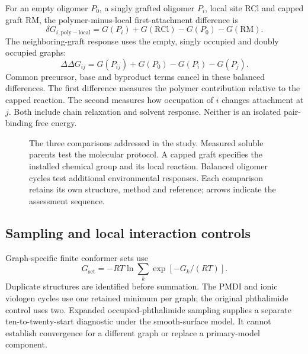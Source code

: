 \documentclass[11pt]{article}
\begin{document}
For an empty oligomer $P_0$, a singly grafted oligomer $P_i$, local site RCl and capped graft RM, the polymer-minus-local first-attachment difference is
\begin{equation}
\delta G_{i,\mathrm{poly-local}}=G(P_i)+G(\mathrm{RCl})-G(P_0)-G(\mathrm{RM}).
\label{eq:polylocal}
\end{equation}
The neighboring-graft response uses the empty, singly occupied and doubly occupied graphs:
\begin{equation}
\Delta\Delta G_{ij}=G(P_{ij})+G(P_0)-G(P_i)-G(P_j).
\label{eq:nonadditivity}
\end{equation}
Common precursor, base and byproduct terms cancel in these balanced differences. The first difference measures the polymer contribution relative to the capped reaction. The second measures how occupation of $i$ changes attachment at $j$. Both include chain relaxation and solvent response. Neither is an isolated pair-binding free energy.

\begin{figure}[htbp]\centering
{}
\caption{The three comparisons addressed in the study. Measured soluble parents test the molecular protocol. A capped graft specifies the installed chemical group and its local reaction. Balanced oligomer cycles test additional environmental responses. Each comparison retains its own structure, method and reference; arrows indicate the assessment sequence.}
\label{fig:workflow}\end{figure}

\subsection{Sampling and local interaction controls}
Graph-specific finite conformer sets use
\begin{equation}
G_{\mathrm{set}}=-RT\ln\sum_k\exp[-G_k/(RT)].
\end{equation}
Duplicate structures are identified before summation. The PMDI and ionic viologen cycles use one retained minimum per graph; the original phthalimide control uses two. Expanded occupied-phthalimide sampling supplies a separate ten-to-twenty-start diagnostic under the smooth-surface model. It cannot establish convergence for a different graph or replace a primary-model component.
\end{document}
